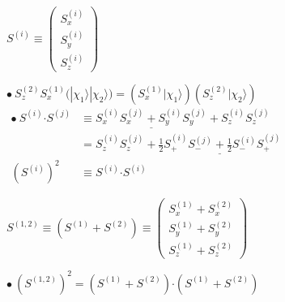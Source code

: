 \documentclass[12pt]{article}
\newcommand{\dotP}{\boldsymbol \cdot}		%
\begin{document}
\vspace{10pt} \noindent
\begin{minipage}[t]{.5\textwidth}
    \begin{center} \( 
        S^{(i)} \equiv 
        \left( \begin{matrix} 
            S^{(i)}_x\\[5pt] 
            S^{(i)}_y\\[5pt] 
            S^{(i)}_z 
        \end{matrix}\right) 
    \) \end{center}
        
    \( 
        \bullet \ S^{(2)}_z S^{(1)}_x \Big( | \chi_1 \rangle | \chi_2 \rangle \Big)
        = \left( S^{(1)}_x | \chi_1 \rangle \right) \left( S^{(2)}_z | \chi_2 \rangle \right) 
    \)\\[10pt]
    \( \begin{aligned}
        \bullet \ S^{(i)} \dotP S^{(j)} & \equiv \underline{ S^{(i)}_x S^{(j)}_x + S^{(i)}_y S^{(j)}_y } + S^{(i)}_z S^{(j)}_z \\[5pt]
        & = S^{(i)}_z S^{(j)}_z + \underline{ \tfrac{1}{2} S^{(i)}_+ S^{(j)}_- + \tfrac{1}{2} S^{(i)}_- S^{(j)}_+ }
            \\[5pt]
        ( S^{(i)} )^2 & \equiv S^{(i)} \dotP S^{(i)} 
    \end{aligned}\)
\end{minipage}
\hfill\vline\hfill
\begin{minipage}[t]{.45\textwidth}
    \begin{center} \( 
        S^{(1,2)} \equiv \left( S^{(1)} + S^{(2)} \right) \equiv 
        \left( \begin{matrix} S^{(1)}_x + S^{(2)}_x \\[5pt]
            S^{(1)}_y + S^{(2)}_y \\[5pt]
            S^{(1)}_z + S^{(2)}_z 
        \end{matrix} \right) 
    \) \end{center}

    \( \bullet \ \left( S^{(1,2)} \right)^2 =
        \left( S^{(1)} + S^{(2)} \right) \dotP \left( S^{(1)} + S^{(2)} \right) \)
\end{minipage}
\end{document}
